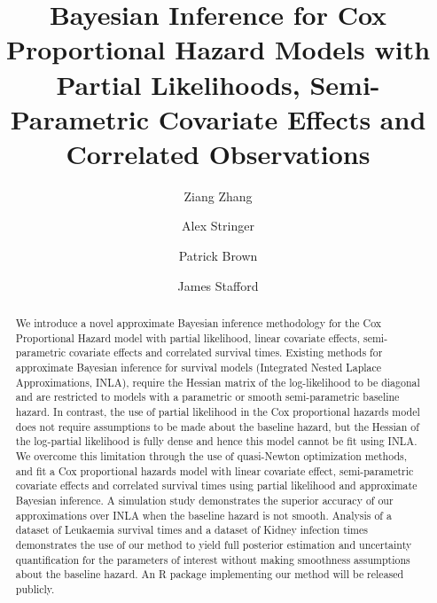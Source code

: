 \documentclass[num-refs,serif,10pt]{wiley-article}
\title{Bayesian Inference for Cox Proportional Hazard Models with Partial Likelihoods, Semi-Parametric Covariate Effects and Correlated Observations}
\author[1]{Ziang Zhang}
\author[1,2]{Alex Stringer}
\author[1,2]{Patrick Brown}
\author[1]{James Stafford}
\affil[1]{Department of Statistical Sciences, University of Toronto, Ontario,Canada}
\affil[2]{Centre for Global Health Research, St. Michael's Hospital, Ontario,Canada}
\begin{document}
\begin{frontmatter}
\maketitle

\begin{abstract}
{\selectfont
We introduce a novel approximate Bayesian inference methodology for the Cox Proportional Hazard model with partial likelihood, linear covariate effects, semi-parametric covariate effects and correlated survival times. Existing methods for approximate Bayesian inference for survival models (Integrated Nested Laplace Approximations, INLA), require the Hessian matrix of the log-likelihood to be diagonal and are restricted to models with a parametric or smooth semi-parametric baseline hazard. In contrast, the use of partial likelihood in the Cox proportional hazards model does not require assumptions to be made about the baseline hazard, but the Hessian of the log-partial likelihood is fully dense and hence this model cannot be fit using INLA. We overcome this limitation through the use of quasi-Newton optimization methods, and fit a Cox proportional hazards model with linear covariate effect, semi-parametric covariate effects and correlated survival times using partial likelihood and approximate Bayesian inference. A simulation study demonstrates the superior accuracy of our approximations over INLA when the baseline hazard is not smooth. Analysis of a dataset of Leukaemia survival times and a dataset of Kidney infection times demonstrates the use of our method to yield full posterior estimation and uncertainty quantification for the parameters of interest without making smoothness assumptions about the baseline hazard. An R package implementing our method will be released publicly.}

\end{abstract}
\end{frontmatter}
\end{document}
